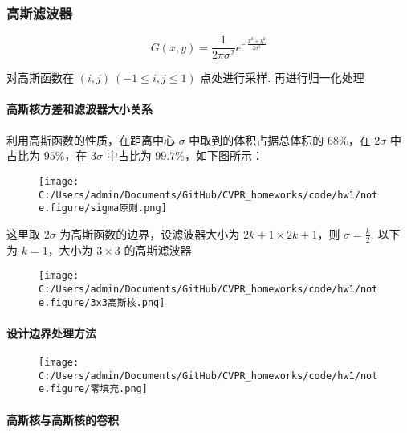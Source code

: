 \documentclass[
]{article}
\author{}
\date{}
\begin{document}
\hypertarget{ux9ad8ux65afux6ee4ux6ce2ux5668}{%
\subsubsection{高斯滤波器}\label{ux9ad8ux65afux6ee4ux6ce2ux5668}}

\[G(x, y) = \frac{1}{2\pi\sigma^2}e^{-\frac{x^2+y^2}{2\sigma^2}}\]

对高斯函数在 \((i,j)\ (-1\leqslant i,j\leqslant 1)\) 点处进行采样.
再进行归一化处理

\hypertarget{ux9ad8ux65afux6838ux65b9ux5deeux548cux6ee4ux6ce2ux5668ux5927ux5c0fux5173ux7cfb}{%
\paragraph{高斯核方差和滤波器大小关系}\label{ux9ad8ux65afux6838ux65b9ux5deeux548cux6ee4ux6ce2ux5668ux5927ux5c0fux5173ux7cfb}}

利用高斯函数的性质，在距离中心 \(\sigma\) 中取到的体积占据总体积的
\(68\%\)，在 \(2\sigma\) 中占比为 \(95\%\)，在 \(3\sigma\) 中占比为
\(99.7\%\)，如下图所示：

\begin{figure}
\centering
\texttt{[image: C:/Users/admin/Documents/GitHub/CVPR\_homeworks/code/hw1/note.figure/sigma原则.png]}
\caption{}
\end{figure}

这里取 \(2\sigma\) 为高斯函数的边界，设滤波器大小为
\(2k+1\times 2k+1\)，则 \(\sigma = \frac{k}{2}\). 以下为 \(k=1\)，大小为
\(3\times 3\) 的高斯滤波器

\begin{figure}
\centering
\texttt{[image: C:/Users/admin/Documents/GitHub/CVPR\_homeworks/code/hw1/note.figure/3x3高斯核.png]}
\caption{}
\end{figure}

\hypertarget{ux8bbeux8ba1ux8fb9ux754cux5904ux7406ux65b9ux6cd5}{%
\paragraph{设计边界处理方法}\label{ux8bbeux8ba1ux8fb9ux754cux5904ux7406ux65b9ux6cd5}}

\begin{figure}
\centering
\texttt{[image: C:/Users/admin/Documents/GitHub/CVPR\_homeworks/code/hw1/note.figure/零填充.png]}
\caption{}
\end{figure}

\hypertarget{ux9ad8ux65afux6838ux4e0eux9ad8ux65afux6838ux7684ux5377ux79ef}{%
\paragraph{高斯核与高斯核的卷积}\label{ux9ad8ux65afux6838ux4e0eux9ad8ux65afux6838ux7684ux5377ux79ef}}
\end{document}
